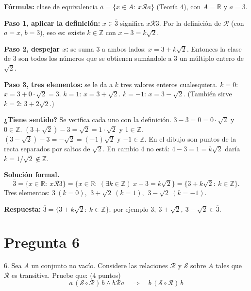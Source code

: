 \documentclass[11pt]{article}
\begin{document}

\begin{explica}
\textbf{Fórmula:} clase de equivalencia $\overline a=\{x\in A:\ x\mathcal Ra\}$ (Teoría 4), con $A=\mathbb R$ y $a=3$.

\textbf{Paso 1, aplicar la definición:} $x\in\overline 3$ significa $x\mathcal R3$. Por la definición de $\mathcal R$ (con $a=x$, $b=3$), eso es: existe $k\in\mathbb Z$ con $x-3=k\sqrt2$.

\textbf{Paso 2, despejar $x$:} se suma $3$ a ambos lados: $x=3+k\sqrt2$. Entonces la clase de $3$ son todos los números que se obtienen sumándole a $3$ un múltiplo entero de $\sqrt2$.

\textbf{Paso 3, tres elementos:} se le da a $k$ tres valores enteros cualesquiera.
$k=0$: $x=3+0\cdot\sqrt2=3$. \quad $k=1$: $x=3+\sqrt2$. \quad $k=-1$: $x=3-\sqrt2$. (También sirve $k=2$: $3+2\sqrt2$.)

\textbf{¿Tiene sentido?} Se verifica cada uno con la definición. $3-3=0=0\cdot\sqrt2$ y $0\in\mathbb Z$. $(3+\sqrt2)-3=\sqrt2=1\cdot\sqrt2$ y $1\in\mathbb Z$. $(3-\sqrt2)-3=-\sqrt2=(-1)\sqrt2$ y $-1\in\mathbb Z$. En el dibujo son puntos de la recta separados por saltos de $\sqrt2$. En cambio $4$ no está: $4-3=1=k\sqrt2$ daría $k=1/\sqrt2\notin\mathbb Z$.
\end{explica}

\textbf{Solución formal.}
\[
\overline 3=\{x\in\mathbb R:\ x\mathcal R3\}=\{x\in\mathbb R:\ (\exists k\in\mathbb Z)\ x-3=k\sqrt2\}=\{3+k\sqrt2:\ k\in\mathbb Z\}.
\]
Tres elementos: $3\ (k=0)$, $\ 3+\sqrt2\ (k=1)$, $\ 3-\sqrt2\ (k=-1)$.

\textbf{Respuesta:} $\overline 3=\{3+k\sqrt2:\ k\in\mathbb Z\}$; por ejemplo $3,\ 3+\sqrt2,\ 3-\sqrt2\in\overline 3$.

\clearpage
\section*{Pregunta 6}

6. Sea $A$ un conjunto no vacío. Considere las relaciones $\mathcal R$ y $\mathcal S$ sobre $A$ tales que \colorbox{green!35}{$\mathcal R$ es transitiva.} Pruebe que: \hfill (4 puntos)
\[
a\,(\mathcal S\circ\mathcal R)\,b\wedge b\mathcal Ra\quad\Longrightarrow\quad b\,(\mathcal S\circ\mathcal R)\,b
\]
\end{document}
